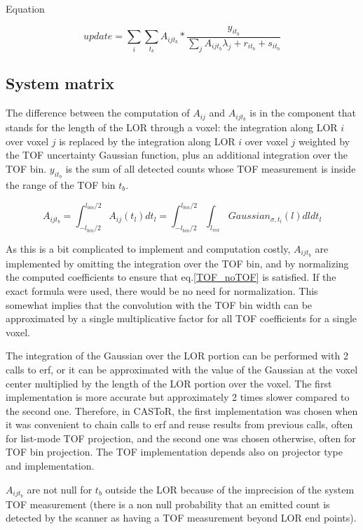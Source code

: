 \documentclass[a4paper, 11pt]{article}
\begin{document}
Equation

\begin{equation}
update = \sum_{i}\sum_{t_b}{A_{ijt_b}*\frac{y_{it_b}}{\sum_j{A_{ijt_b}\lambda_j+r_{it_b}+s_{it_b}}}}
\end{equation}

\subsection{System matrix}

The difference between the computation of $A_{ij}$ and $A_{ijt_b}$ is in the component that stands for the length of the LOR through a voxel: the integration along LOR $i$ over voxel $j$ is replaced by the integration along LOR $i$ over voxel $j$ weighted by the TOF uncertainty Gaussian function, plus an additional integration over the TOF bin. $y_{it_b}$ is the sum of all detected counts whose TOF measurement is inside the range of the TOF bin $t_b$.

\begin{equation}
A_{ijt_b}=\int_{-l_{bin}/2}^{l_{bin}/2}{A_{ij}(t_l)dt_l}=\int_{-l_{bin}/2}^{l_{bin}/2}\int_{l_{vox}}{Gaussian_{\sigma,t_l}(l)dldt_l}
\end{equation}

As this is a bit complicated to implement and computation costly, $A_{ijt_b}$ are implemented by omitting the integration over the TOF bin, and by normalizing the computed coefficients to ensure that eq.\ref{TOF_noTOF} is satisfied. If the exact formula were used, there would be no need for normalization. This somewhat implies that the convolution with the TOF bin width can be approximated by a single multiplicative factor for all TOF coefficients for a single voxel.

The integration of the Gaussian over the LOR portion can be performed with 2 calls to erf, or it can be approximated with the value of the Gaussian at the voxel center multiplied by the length of the LOR portion over the voxel. The first implementation is more accurate but approximately 2 times slower compared to the second one. Therefore, in CASToR, the first implementation was chosen when it was convenient to chain calls to erf and reuse results from previous calls, often for list-mode TOF projection, and the second one was chosen otherwise, often for TOF bin projection. The TOF implementation depends also on projector type and implementation.

$A_{ijt_b}$ are not null for $t_b$ outside the LOR because of the imprecision of the system TOF measurement (there is a non null probability that an emitted count is detected by the scanner as having a TOF measurement beyond LOR end points).
\end{document}
